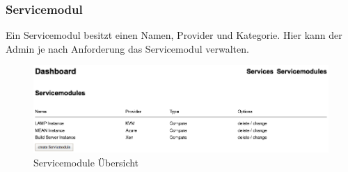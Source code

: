 \subsubsection{Servicemodul}
Ein \gls{Servicemodul} besitzt einen Namen, Provider und Kategorie.
Hier kann der Admin je nach Anforderung das Servicemodul verwalten.
\newline
\begin{figure}[!htbp]
\includegraphics[width=\textwidth]{./04_Anforderungen/images/servicemodules_admin}
\caption{Servicemodule Übersicht}
\end{figure}